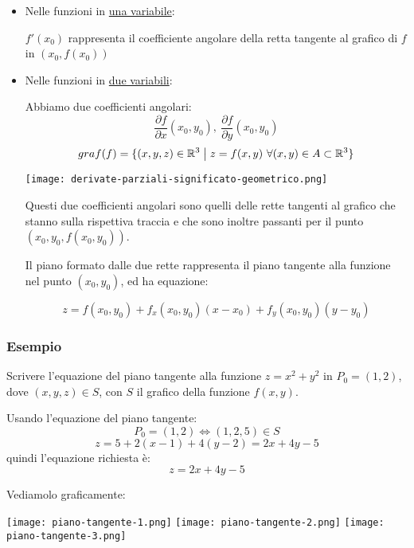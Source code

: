 \begin{itemize}
    \item Nelle funzioni in \underline{una variabile}:

          \(f'(x_0)\) rappresenta il coefficiente angolare della retta tangente al grafico di \(f\) in \((x_0,f(x_0))\)

    \item Nelle funzioni in \underline{due variabili}:

          Abbiamo due coefficienti angolari:
          \[
              \frac{\partial f}{\partial x}(x_0,y_0),\ \frac{\partial f}{\partial y}(x_0,y_0)
          \]
          \[
              graf(f) = \{(x,y,z) \in \mathbb{R}^{3} \;\big|\; z = f(x,y) ~\forall (x,y) \in A \subset \mathbb{R}^{3}\}
          \]

          \vspace{4mm}
          \texttt{[image: derivate-parziali-significato-geometrico.png]}
          \vspace{4mm}

          Questi due coefficienti angolari sono quelli delle rette tangenti al grafico che stanno sulla rispettiva traccia e che sono inoltre passanti per il punto \((x_0,y_0,f(x_0,y_0))\).

          Il piano formato dalle due rette rappresenta il piano tangente alla funzione nel punto \((x_0,y_0)\), ed ha equazione:

          \[
              z = f(x_0,y_0) + f_x(x_0,y_0) (x-x_0) + f_y(x_0,y_0) (y-y_0)
          \]
\end{itemize}

\subsubsection*{Esempio}

Scrivere l'equazione del piano tangente alla funzione \(z = x^{2}+y^{2}\) in \(P_0=(1,2)\),
dove \((x,y,z) \in S\), con \(S\) il grafico della funzione \(f(x,y)\).

Usando l'equazione del piano tangente:
\[
    P_0=(1,2) \iff (1,2,5) \in S
\]
\[
    z= 5+ 2(x-1) + 4(y-2) = 2x+4y -5
\]
quindi l'equazione richiesta è:
\[
    z = 2x+4y-5
\]

Vediamolo graficamente:
\filbreak{}

\begin{center}
    \texttt{[image: piano-tangente-1.png]}
    \texttt{[image: piano-tangente-2.png]}
    \texttt{[image: piano-tangente-3.png]}
\end{center}

